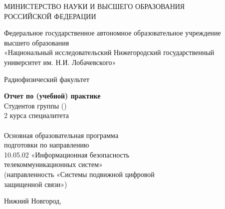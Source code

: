 \begin{titlepage}
	\centering
	
	МИНИСТЕРСТВО НАУКИ И ВЫСШЕГО ОБРАЗОВАНИЯ \\
	РОССИЙСКОЙ ФЕДЕРАЦИИ
	
	\vspace{1em}
	Федеральное государственное автономное образовательное учреждение \\
	высшего образования \\
	«Национальный исследовательский Нижегородский государственный \\
	университет им. Н.И. Лобачевского»
	
	\vspace{1em}
	Радиофизический факультет
	
	\vfill
	\begin{minipage}{0.8\linewidth}
		\centering\large\bfseries\MakeUppercase{\labtheme}
	\end{minipage}
	
	\vfill
	\begin{flushright}
		\begin{minipage}{0.5\textwidth}
			\raggedright
			{\bfseries Отчет по (учебной) практике}\\
			Студентов группы \labgroupshort (\labgroupfull)\\
			2 курса специалитета\\
			\labauthors \\
			\vspace{1em}
			Основная образовательная программа\\
			подготовки по направлению\\
			10.05.02 «Информационная безопасность\\
			телекоммуникационных систем»\\
			(направленность «Системы подвижной цифровой\\
			защищенной связи»)
		\end{minipage}
	\end{flushright}
	
	\vfill
	Нижний Новгород, \the\year{}
\end{titlepage}
\newpage
\thispagestyle{empty}
\null
\newpage
